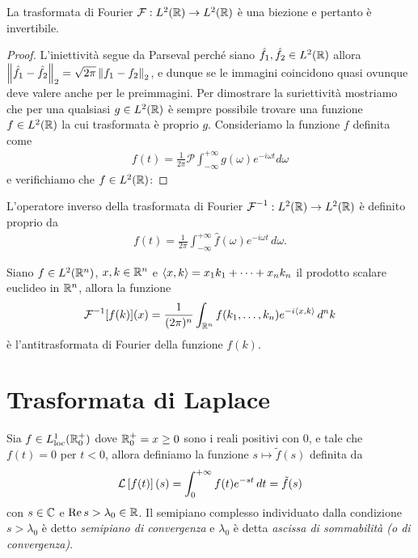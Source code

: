 \begin{theorem}
  La trasformata di Fourier $ \F: L^2(\R) \to L^2(\R) $ è una biezione e pertanto è invertibile.
\end{theorem}
\begin{proof}
  L'iniettività segue da Parseval perché siano $ \hat{f}_1, \hat{f}_2 \in L^2(\R) $ allora 
  $ \norm{\hat{f}_1 - \hat{f}_2}_2 = \sqrt{2\pi} \norm{f_1 - f_2}_2 $, e dunque se le immagini coincidono quasi ovunque deve valere anche 
  per le preimmagini. Per dimostrare la suriettività mostriamo che per una qualsiasi $ g \in L^2(\R) $ è sempre possibile trovare una funzione 
  $ f \in L^2(\R) $ la cui trasformata è proprio $ g $. Consideriamo la funzione $ f $ definita come
  \begin{align}
    f(t) = \frac1{2\pi} \mathcal{P} \int_{-\infty}^{+\infty} g(\omega) e^{-i\omega t} d\omega
  \end{align}
  e verifichiamo che $ f \in L^2(\R) $: 
\end{proof}
\begin{corollary}
  L'operatore inverso della trasformata di Fourier $ \F^{-1}: L^2(\R) \to L^2(\R) $ è definito proprio da 
  \begin{align}
    f(t) = \frac1{2\pi} \int_{-\infty}^{+\infty} \hat{f}(\omega) e^{-i\omega t} \, d\omega.
  \end{align}
\end{corollary}

\begin{definition}[ Antitrasformata in $ L^2(\R^n) $ ]
  Siano $ f \in L^2(\R^n) $, $ x,k \in \R^n $ e $ \sc{x,k} = x_1 k_1 + \dots + x_nk_n $ il prodotto scalare euclideo in $ \R^n $, allora la funzione 
  \begin{align}
    \F^{-1}[f(k)](x) = \frac1{(2\pi)^n} \int_{\R^n} f(k_1, \dots, k_n) e^{-i \sc{x,k}} \, d^nk
  \end{align}
  è l'antitrasformata di Fourier della funzione $ f(k) $.
\end{definition}

\section{Trasformata di Laplace}

\begin{definition}
  Sia $ f \in L^1_{\text{loc}}(\R_0^+) $ dove $ \R_0^+ = x \geq 0 $ sono i reali positivi con $ 0 $, e tale che $ f(t) = 0 $ per $ t < 0 $, allora 
  definiamo la funzione $ s \mapsto \tilde{f}(s) $ definita da 
  \begin{align}
    \L\left[ f(t) \right](s) = \int_0^{+\infty} f(t) e^{-st}\, dt = \tilde{f}(s)
  \end{align}
  con $ s \in \C $ e $ \text{Re} \,s > \lambda_0 \in \R $. Il semipiano complesso individuato dalla condizione $ s > \lambda_0 $ è detto 
  \textit{semipiano di convergenza} e $ \lambda_0 $ è detta \textit{ascissa di sommabilità (o di convergenza)}.
\end{definition}

